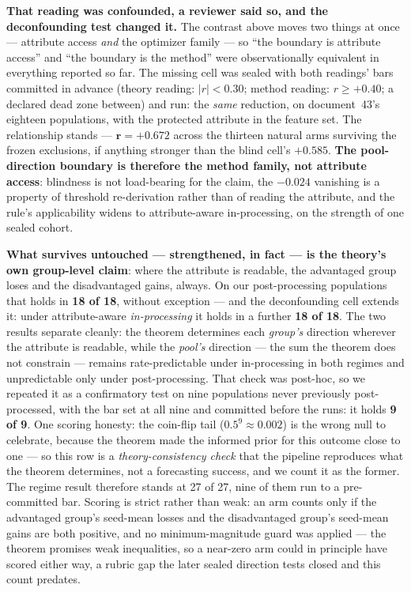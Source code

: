 \documentclass[conference]{IEEEtran}
\begin{document}
\textbf{That reading was confounded, a reviewer said so, and the deconfounding test
changed it.} The contrast above moves two things at once --- attribute access \emph{and}
the optimizer family --- so ``the boundary is attribute access'' and ``the boundary is
the method'' were observationally equivalent in everything reported so far. The missing
cell was sealed with both readings' bars committed in advance (theory reading:
$|r| < 0.30$; method reading: $r \ge +0.40$; a declared dead zone between) and run:
the \emph{same} reduction, on document~43's eighteen populations, with the protected
attribute in the feature set. The relationship stands --- $\mathbf{r = +0.672}$ across
the thirteen natural arms surviving the frozen exclusions, if anything stronger than the
blind cell's $+0.585$. \textbf{The pool-direction boundary is therefore the method
family, not attribute access}: blindness is not load-bearing for the claim, the
$-0.024$ vanishing is a property of threshold re-derivation rather than of reading the
attribute, and the rule's applicability widens to attribute-aware in-processing, on
the strength of one sealed cohort.

\textbf{What survives untouched --- strengthened, in fact --- is the theory's own
group-level claim}: where the attribute is readable, the advantaged group loses and the
disadvantaged gains, always. On our post-processing populations that holds in
\textbf{18 of 18}, without exception --- and the deconfounding cell extends it: under
attribute-aware \emph{in-processing} it holds in a further \textbf{18 of 18}. The two
results separate cleanly: the theorem determines each \emph{group's} direction wherever
the attribute is readable, while the \emph{pool's} direction --- the sum the theorem
does not constrain --- remains rate-predictable under in-processing in both regimes and
unpredictable only under post-processing. That check was
post-hoc, so we repeated it as a confirmatory test on nine populations never previously
post-processed, with the bar set at all nine and committed before the runs: it holds \textbf{9
of 9}. One scoring honesty: the coin-flip tail ($0.5^9 \approx 0.002$) is the wrong null
to celebrate, because the theorem made the informed prior for this outcome close to one
--- so this row is a \emph{theory-consistency check} that the pipeline reproduces what
the theorem determines, not a forecasting success, and we count it as the former. The
regime result therefore stands at 27 of 27, nine of them run to a pre-committed bar.
Scoring is strict rather than weak: an arm counts only if the advantaged group's seed-mean
losses and the disadvantaged group's seed-mean gains are both positive, and no
minimum-magnitude guard was applied --- the theorem promises weak inequalities, so a
near-zero arm could in principle have scored either way, a rubric gap the later sealed
direction tests closed and this count predates.
\end{document}
